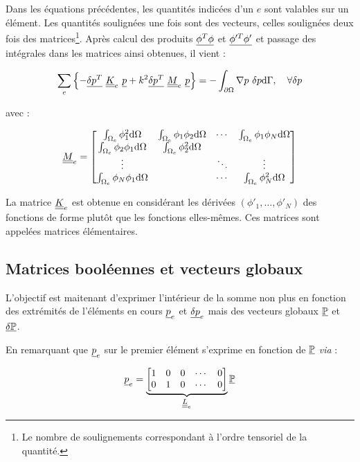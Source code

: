 Dans les équations précédentes, les quantités indicées d'un $e$ sont valables sur un élément. Les quantités soulignées
une fois sont des vecteurs, celles soulignées deux fois des matrices\footnote{Le nombre de soulignements correspondant à
l'ordre tensoriel de la quantité.}.
Après calcul des produits $\underline{\phi^T\phi}$ et $\underline{\phi'^T\phi'}$ et passage des intégrales dans les matrices ainsi
obtenues, il vient :

\begin{equation}
	\sum_e\left\{- \underline{\delta p^T}~\underline{\underline{K}}_e~\underline{p} + k^2 \underline{\delta p^T}~\underline{\underline{M}}_e~\underline{p} \right\} = -\int_{\partial\Omega}\nabla p~\delta p\mathrm{d}\Gamma, \quad \forall\delta p\label{FEM1D:elem_mat}\\
\end{equation}

avec :

\begin{equation*}
	\underline{\underline{M}}_e = \begin{bmatrix}
		\int_{\Omega_e}\phi_1^2\mathrm{d}\Omega & \int_{\Omega_e}\phi_1\phi_2\mathrm{d}\Omega & \cdots  &\int_{\Omega_e}\phi_1\phi_N\mathrm{d}\Omega\\
		\int_{\Omega_e}\phi_2\phi_1\mathrm{d}\Omega & \int_{\Omega_e}\phi_2^2\mathrm{d}\Omega & &\\
		\vdots & & \ddots & \vdots\\
		\int_{\Omega_e}\phi_N\phi_1\mathrm{d}\Omega & & \cdots & \int_{\Omega_e}\phi_N^2\mathrm{d}\Omega
	\end{bmatrix}
\end{equation*}

La matrice $\underline{\underline{K}}_e$ est obtenue en considérant les dérivées $(\phi'_1,\ldots,\phi'_N)$ des fonctions de forme plutôt que les
fonctions elles-mêmes. Ces matrices sont appelées matrices élémentaires.

\subsection{Matrices booléennes et vecteurs globaux}
\newcommand{\GP}{\ul{\mathbb{P}}}
\newcommand{\GDP}{\ul{\delta\mathbb{P}}}
L'objectif est maitenant d'exprimer l'intérieur de la somme non plus en fonction des extrémités de l'éléments en cours
$\underline{p}_e$ et $\underline{\delta p}_e$ mais des vecteurs globaux $\GP$ et $\GDP$.

En remarquant que $\underline{p}_e$ sur le premier élément s'exprime en fonction de $\GP$ \textit{via} :

\begin{equation*}
    \ul{p}_e =
    \underbrace{\begin{bmatrix}
         1 & 0 & 0 & \cdots & 0\\
         0 & 1 & 0 & \cdots & 0
    \end{bmatrix}}_{\uul{L}_e}\GP
\end{equation*}

